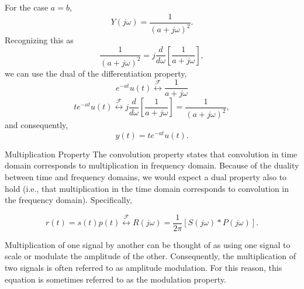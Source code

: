 \begin{frame}
    {
        For the case $a=b$,
        \begin{equation*}
            Y(j\omega) = \frac{1}{(a+j\omega)^2}.
        \end{equation*}
        \pause
        Recognizing this as
        \begin{equation*}
            \frac{1}{(a+j\omega)^2} = j\frac{d}{d\omega}\left[\frac{1}{a+j\omega}\right],
        \end{equation*}
        we can use the dual of the differentiation property,
        \begin{equation*}
            e^{-at}u(t) \overset{\mathcal{F}}{\longleftrightarrow} \frac{1}{a+j\omega}
        \end{equation*}
        \begin{equation*}
            te^{-at}u(t) \overset{\mathcal{F}}{\longleftrightarrow} j\frac{d}{d\omega}\left[\frac{1}{a+j\omega}\right] = \frac{1}{(a+j\omega)^2},
        \end{equation*}
        and consequently,
        \begin{equation*}
            y(t) = te^{-at}u(t).
        \end{equation*}
    }
\end{frame}



\begin{frame}{Multiplication Property}
    The convolution property states that convolution in \alert{time} domain corresponds to multiplication in \alert{frequency} domain. Because of the duality between time and frequency domains, we would expect a dual property also to hold (i.e., that multiplication in the time domain corresponds to convolution in the frequency domain). Specifically,

    \begin{equation*}
        r(t) = s(t)p(t) \overset{\mathcal{F}}{\longleftrightarrow} R(j\omega) = \frac{1}{2\pi}[S(j\omega)\ast P(j\omega)].
    \end{equation*}

    Multiplication of one signal by another can be thought of as using one signal to scale or \alert{modulate} the amplitude of the other. Consequently, the multiplication of two signals is often referred to as \alert{amplitude modulation}. For this reason, this equation is sometimes referred to as the \alert{modulation property}.
\end{frame}

